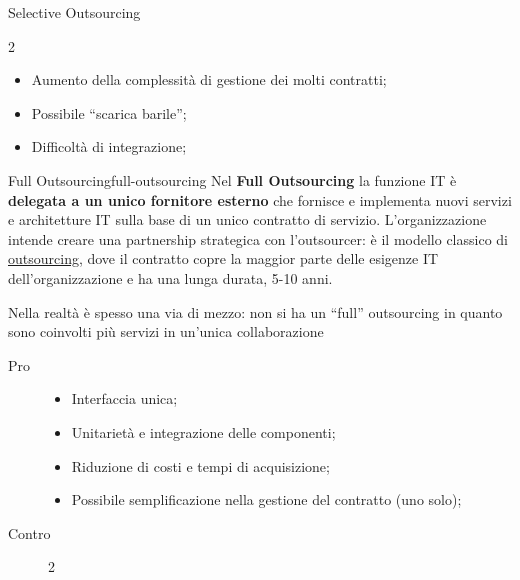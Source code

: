 \begin{description}
\begin{definition}{Selective Outsourcing}{}
\begin{description}
\begin{multicols}{2}
\begin{itemize}
                        \end{itemize}
                    \end{multicols}
                \item[Contro]
                    \begin{itemize}
                        \item Aumento della complessità di gestione dei molti contratti;
                        \item Possibile ``scarica barile'';
                        \item Difficoltà di integrazione;
                    \end{itemize}
            \end{description}
        \end{definition}
        \begin{definition}{Full Outsourcing}{full-outsourcing}
            Nel \textbf{Full Outsourcing} la funzione IT è \textbf{delegata a un unico fornitore esterno} che fornisce e implementa nuovi servizi e architetture IT sulla base di un unico contratto di servizio.
            \emptyln{}
            L'organizzazione intende creare una partnership strategica con l'outsourcer: è il modello classico di \hyperref[sub:ftt_outsourcing]{outsourcing}, dove il contratto copre la maggior parte delle esigenze IT dell'organizzazione e ha una lunga durata, 5-10 anni.
            \begin{warning}
                Nella realtà è spesso una via di mezzo: non si ha un ``full'' outsourcing in quanto sono coinvolti più servizi in un'unica collaborazione
            \end{warning}
            \begin{description}
                \item[Pro] 
                    \begin{itemize}
                        \item Interfaccia unica;
                        \item Unitarietà e integrazione delle componenti;
                        \item Riduzione di costi e tempi di acquisizione;
                        \item Possibile semplificazione nella gestione del contratto (uno solo);
                    \end{itemize}
                \item[Contro] 
                    \begin{multicols}{2}

\end{multicols}
\end{description}
\end{definition}
\end{description}
